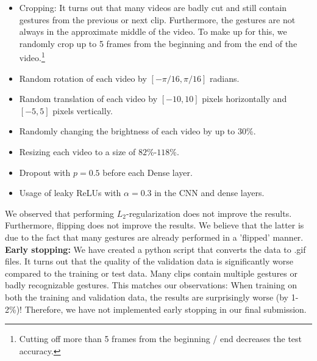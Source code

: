 \documentclass[sigconf]{acmart}
\begin{document}
	\begin{itemize}
		\item Cropping: It turns out that many videos are badly cut and still contain gestures from the previous or next clip. Furthermore, the gestures are not always in the approximate middle of the video. To make up for this, we randomly crop up to 5 frames from the beginning and from the end of the video.\footnote{Cutting off more than 5 frames from the beginning / end decreases the test accuracy.}
		\item Random rotation of each video by $[-\pi/16,\pi/16]$ radians.
		\item Random translation of each video by $[-10,10]$ pixels horizontally and $[-5,5]$ pixels vertically.
		\item Randomly changing the brightness of each video by up to $30$\%.
		\item Resizing each video to a size of $82$\%-$118$\%.
		\item Dropout with $p=0.5$ before each Dense layer.
		\item Usage of leaky ReLUs with $\alpha = 0.3$ in the CNN and dense layers.
	\end{itemize}

	We observed that performing $L_2$-regularization does not improve the results. Furthermore, flipping does not improve the results. We believe that the latter is due to the fact that many gestures are already performed in a 'flipped' manner.\\
	
	\textbf{Early stopping:} We have created a python script that converts the data to .gif files. It turns out that the quality of the validation data is significantly worse compared to the training or test data. Many clips contain multiple gestures or badly recognizable gestures. This matches our observations: When training on both the training and validation data, the results are surprisingly worse (by 1-2\%)! Therefore, we have not implemented early stopping in our final submission.
	
	
	
	
	
\end{document}
